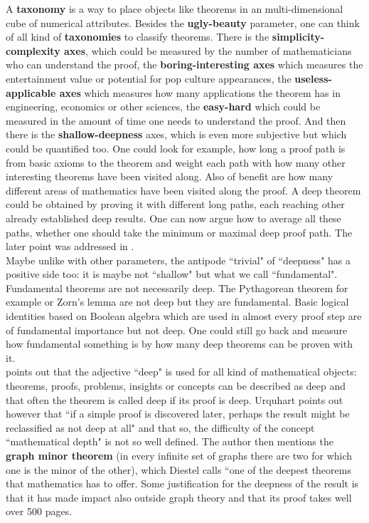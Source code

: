 \documentclass[12pt]{amsart}
\newcounter{example}    \def\example#1{ \item \fontsize{12}{15} \selectfont #1 \fontsize{12}{15} \selectfont }
\begin{document}
A {\bf taxonomy} is a way to place objects like theorems in an multi-dimensional cube of numerical 
attributes. Besides the {\bf ugly-beauty} parameter, one can think of all kind of {\bf taxonomies} 
to classify theorems. There is the {\bf simplicity-complexity axes}, which could be measured by the
number of mathematicians who can understand the proof, the {\bf boring-interesting axes} which
measures the entertainment value or potential for pop culture appearances, 
the {\bf useless-applicable axes} which measures how many applications the theorem has 
in engineering, economics or other sciences, the {\bf easy-hard} which could be measured 
in the amount of time one needs to understand the proof. And then there is the 
{\bf shallow-deepness} axes, which is even more subjective but which could be quantified too. 
One could look for example, how long a proof path is from basic axioms to the theorem and 
weight each path with how many other interesting theorems have been visited along. 
Also of benefit are how many different areas of mathematics have been visited along the proof. 
A deep theorem could be obtained by proving it with different long paths, each reaching 
other already established deep results. One can now
argue how to average all these paths, whether one should take the minimum or maximal deep proof
path. The later point was addressed in \cite{Lange2014}. \\

Maybe unlike with other parameters, the antipode ``trivial" of ``deepness" has a positive side too: it is maybe
not ``shallow" but what we call ``fundamental". Fundamental theorems are not necessarily deep. 
The Pythagorean theorem for example or Zorn's lemma are not deep but they are fundamental. 
Basic logical identities based on Boolean algebra which are used in almost every proof step are of 
fundamental importance but not deep. 
One could still go back and measure how fundamental something is by how many deep theorems
can be proven with it. \\

\cite{Urquhart2015} points out that the adjective ``deep" is used for all kind of mathematical
objects: theorems, proofs, problems, insights or concepts can be described as deep and that
often the theorem is called deep if its proof is deep. Urquhart points out however that
``if a simple proof is discovered later, perhaps the result might be reclassified as not deep at all"
and that so, the difficulty of the concept ``mathematical depth" is not so well defined. The author
then mentions the {\bf graph minor theorem} (in every infinite set of graphs there are two for which one is the
minor of the other), which Diestel \cite{Diestel} calls ``one of the deepest theorems that mathematics
has to offer. Some justification for the deepness of the result is that it has made impact also
outside graph theory and that its proof takes well over 500 pages. \\
\end{document}
